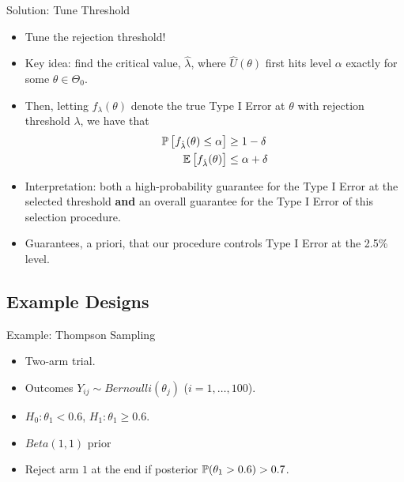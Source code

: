 \begin{frame}{Solution: Tune Threshold}
\begin{itemize}
    \item Tune the rejection threshold!
    \item Key idea: find the critical value, $\hat{\lambda}$, where $\hat{U}(\theta)$ first hits level $\alpha$ exactly for some $\theta \in \Theta_0$.
    \item Then, letting $f_\lambda(\theta)$ denote the true Type I Error at $\theta$ with rejection threshold $\lambda$, we have that
        \begin{align*}
            \mathbb{P}\left[f_{\hat{\lambda}}(\theta) \leq \alpha\right] &\geq 1-\delta \\
            \mathbb{E}\left[f_{\hat{\lambda}}(\theta)\right] 
            &\leq \alpha + \delta
        \end{align*}
    \item Interpretation: both a high-probability guarantee for the Type I Error at the selected threshold \textbf{and} an overall guarantee for the Type I Error of this selection procedure.
    \item Guarantees, a priori, that our procedure controls Type I Error at the 2.5\% level.
\end{itemize}
\end{frame}

\subsection{Example Designs}

\begin{frame}{Example: Thompson Sampling}
\begin{itemize}
    \item Two-arm trial.
    \item Outcomes $Y_{ij} \sim Bernoulli(\theta_j)$ ($i=1,\ldots,100$).
    \item $H_0: \theta_1 < 0.6$, $H_1: \theta_1 \geq 0.6$.
    \item $Beta(1,1)$ prior
    \item Reject arm $1$ at the end if posterior $\mathbb{P}(\theta_1  > 0.6) > 0.7$.
\end{itemize}
\end{frame}

